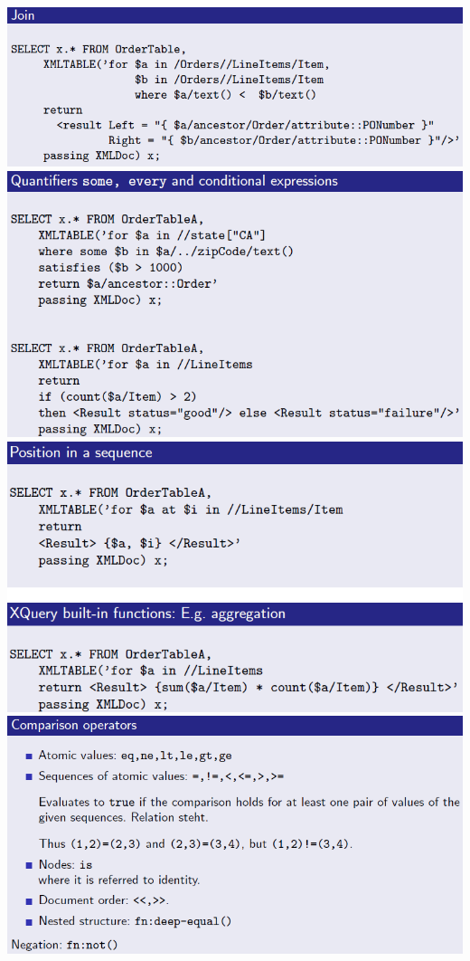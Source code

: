 \documentclass{article}
\begin{document}
\includegraphics[scale=0.5]{9.png}\\
\includegraphics[scale=0.5]{10.png}
\includegraphics[scale=0.5]{11.png}\\
\includegraphics[scale=0.5]{12.png}\\
\end{document}
